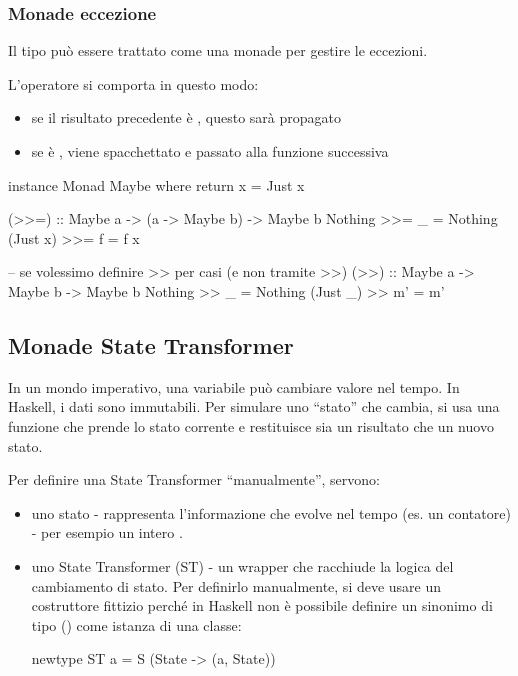 \subsubsection{Monade eccezione}
Il tipo  può essere trattato come una monade per gestire le eccezioni.

L'operatore \code {>>=} si comporta in questo modo:
\begin{itemize}
    \item se il risultato precedente è , questo sarà propagato
    \item se è ,  viene spacchettato e passato alla funzione successiva
\end{itemize}

\begin{haskellbox}{}
instance Monad Maybe where
    return x = Just x

    (>>=) :: Maybe a -> (a -> Maybe b) -> Maybe b
    Nothing >>= _ = Nothing
    (Just x) >>= f = f x

    -- se volessimo definire >> per casi (e non tramite >>)
    (>>) :: Maybe a -> Maybe b -> Maybe b
    Nothing  >> _ = Nothing
    (Just _) >> m' = m'
\end{haskellbox}

\subsection{Monade State Transformer}
In un mondo imperativo, una variabile può cambiare valore nel tempo. In Haskell,  i dati sono immutabili. Per simulare uno ``stato'' che cambia, si usa una funzione che prende lo stato corrente e restituisce sia un risultato che un nuovo stato.

Per definire una State Transformer ``manualmente'', servono:
\begin{itemize}
    \item uno stato - rappresenta l'informazione che evolve nel tempo (es. un contatore) - per esempio un intero
        \subitem {}.
    \item uno State Transformer (ST) - un wrapper che racchiude la logica del cambiamento di stato. Per definirlo manualmente, si deve usare un costruttore fittizio  perché in Haskell non è possibile definire un sinonimo di tipo () come istanza di una classe:
\begin{haskellbox}{}
newtype ST a = S (State -> (a, State))
\end{haskellbox}
\end{itemize}

